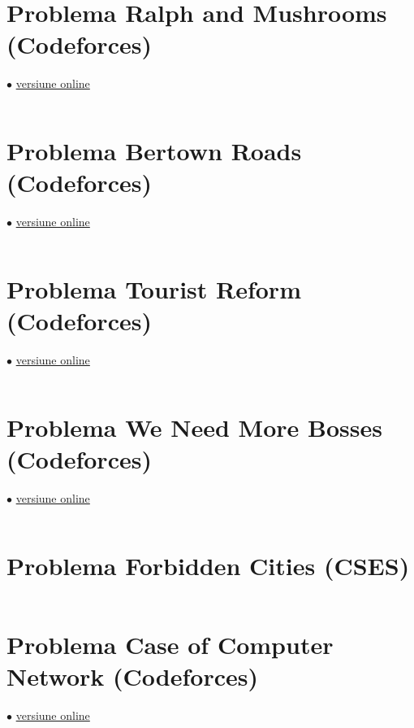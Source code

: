 \documentclass[../main.tex]{subfiles}
\begin{document}
\inputminted{cpp}{../src/graphs/mr-kitayuta-s-technology.cpp}

\section{Problema Ralph and Mushrooms (Codeforces)}
\label{code:ralph-and-mushrooms}
$\bullet$
\href{https://codeforces.com/contest/894/submission/362613139}{versiune online}

\inputminted{cpp}{../src/graphs/ralph-and-mushrooms.cpp}

\section{Problema Bertown Roads (Codeforces)}
\label{code:bertown-roads}
$\bullet$
\href{https://codeforces.com/contest/118/submission/362622304}{versiune online}

\inputminted{cpp}{../src/graphs/bertown-roads.cpp}

\section{Problema Tourist Reform (Codeforces)}
\label{code:tourist-reform}
$\bullet$
\href{https://codeforces.com/contest/732/submission/362623100}{versiune online}

\inputminted{cpp}{../src/graphs/tourist-reform.cpp}

\section{Problema We Need More Bosses (Codeforces)}
\label{code:we-need-more-bosses}
$\bullet$
\href{https://codeforces.com/contest/1000/submission/307860068}{versiune online}

\inputminted{cpp}{../src/graphs/we-need-more-bosses.cpp}

\section{Problema Forbidden Cities (CSES)}
\label{code:forbidden-cities}

\inputminted{cpp}{../src/graphs/forbidden-cities.cpp}

\section{Problema Case of Computer Network (Codeforces)}
\label{code:case-of-computer-network}
$\bullet$
\href{https://codeforces.com/contest/555/submission/362625550}{versiune online}
\end{document}
